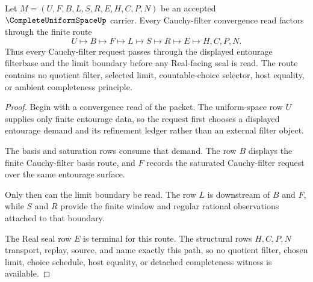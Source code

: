 \begin{theorem}
\label{thm:complete-uniform-space-cauchy-filter-convergence}
Let $M=(U,F,B,L,S,R,E,H,C,P,N)$ be an accepted $\CompleteUniformSpaceUp$ carrier. Every Cauchy-filter convergence read factors through the finite route
$$
U \longmapsto B \longmapsto F \longmapsto L \longmapsto S \longmapsto R \longmapsto E \longmapsto H,C,P,N .
$$
Thus every Cauchy-filter request passes through the displayed entourage filterbase and the limit boundary before any Real-facing seal is read. The route contains no quotient filter, selected limit, countable-choice selector, host equality, or ambient completeness principle.
\end{theorem}
\begin{proof}
Begin with a convergence read of the packet. The uniform-space row $U$ supplies only finite entourage data, so the request first chooses a displayed entourage demand and its refinement ledger rather than an external filter object.

The basis and saturation rows consume that demand. The row $B$ displays the finite Cauchy-filter basis route, and $F$ records the saturated Cauchy-filter request over the same entourage surface.

Only then can the limit boundary be read. The row $L$ is downstream of $B$ and $F$, while $S$ and $R$ provide the finite window and regular rational observations attached to that boundary.

The Real seal row $E$ is terminal for this route. The structural rows $H,C,P,N$ transport, replay, source, and name exactly this path, so no quotient filter, chosen limit, choice schedule, host equality, or detached completeness witness is available.
\end{proof}


